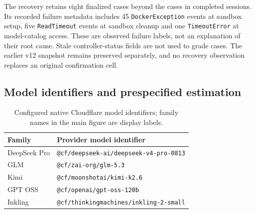 \begin{table}[ht]
\centering\small
\caption{Separate exploratory recovery at its frozen capture. Assigned session
counts vary by model and sum to 75; assigned cases sum to 150. There are
19 completed, 51 failed and five interrupted journal dispositions, with no
pending or running assignments. Finalized case evidence survives an enclosing-run failure. Unresolved
outcomes stay in the assigned denominators. These attempts do not replace
confirmation failures or enter Figure~\ref{fig:collection-outcomes}.}
\label{tab:collection-recovery}

\end{table}

The recovery retains eight finalized cases beyond the cases in completed
sessions. Its recorded failure metadata includes 45 \texttt{DockerException}
events at sandbox setup, five \texttt{ReadTimeout} events at sandbox cleanup
and one \texttt{TimeoutError} at model-catalog access. These are observed
failure labels, not an explanation of their root cause. Stale controller-status
fields are not used to grade cases. The earlier v12 snapshot remains preserved
separately, and no recovery observation replaces an original confirmation cell.

\subsection{Model identifiers and prespecified estimation}
\label{app:estimation}
\begin{table}[ht]
\centering\small
\caption{Configured native Cloudflare model identifiers; family names in the
main figure are display labels.}
\label{tab:models}
\begin{tabular}{ll}
\toprule Family & Provider model identifier\\
\midrule
DeepSeek Pro & \texttt{@cf/deepseek-ai/deepseek-v4-pro-0813}\\
GLM & \texttt{@cf/zai-org/glm-5.3}\\
Kimi & \texttt{@cf/moonshotai/kimi-k2.6}\\
GPT OSS & \texttt{@cf/openai/gpt-oss-120b}\\
Inkling & \texttt{@cf/thinkingmachines/inkling-2-small}\\
\bottomrule
\end{tabular}
\end{table}

